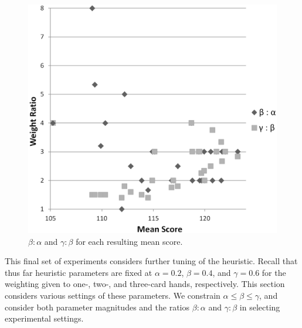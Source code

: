 \documentclass[letterpaper]{article}
\begin{document}
\begin{figure}[t]
\begin{center}
\includegraphics[width=1\linewidth]{images/1-2-3_ratios.png}
\end{center}
\caption{$\beta:\alpha$ and $\gamma:\beta$ for each resulting mean score.}
\label{fig:123ratios}
\end{figure}

This final set of experiments considers further tuning of the heuristic. Recall that thus far heuristic parameters are fixed at $\alpha = 0.2$, $\beta = 0.4$, and $\gamma = 0.6$ for the weighting given to one-, two-, and three-card hands, respectively. This section considers various settings of these parameters. We constrain $\alpha \leq \beta \leq \gamma$, and consider both parameter magnitudes and the ratios $\beta : \alpha$ and $\gamma : \beta$ in selecting experimental settings.

\end{document}
